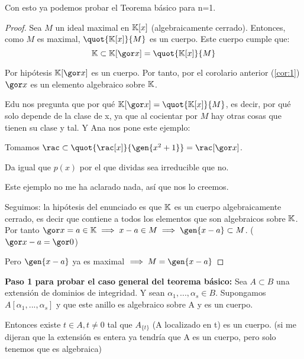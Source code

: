Con esto ya podemos probar el Teorema básico para n=1.
\begin{proof}
	Sea $M$ un ideal maximal en $\mathbb{K}[x]$ (algebraicamente cerrado). Entonces, como $M$ es maximal, $\quot{\K[x]}{M}$ es un cuerpo. Este cuerpo cumple que:
	$$ \K  \subset \K[\cls{x}] = \quot{\K[x]}{M}$$

	Por hipótesis $\K[\cls{x}]$ es un cuerpo. Por tanto, por el corolario anterior (\ref{cor:1}) $\cls{x}$ es un elemento algebraico sobre $\mathbb{K}$. 

	Edu nos pregunta que por qué $\K[\cls{x}] = \quot{\K[x]}{M}$, es decir, por qué solo depende de la clase de x, ya que al cocientar por $M$ hay otras cosas que tienen su clase y tal. Y Ana nos pone este ejemplo:

	\begin{example}
		Tomamos $\rac \subset \quot{\rac[x]}{\gen{x^2+1}} = \rac[\cls{x}]$.

		Da igual que $p(x)$ por el que dividas sea irreducible que no.
		
		Este ejemplo no me ha aclarado nada, así que nos lo creemos.
	\end{example}

	Seguimos: la hipótesis del enunciado es que $\mathbb{K}$ es un cuerpo algebraicamente cerrado, es decir que contiene a todos los elementos que son algebraicos sobre $\mathbb{K}$. Por tanto $\cls{x}=a \in \K \implies x-a \in M \implies \gen{x-a} \subset M$. ($\cls{x}-a = \cls{0}$)

	Pero $\gen{x-a}$ ya es maximal $\implies M = \gen{x-a}$
\end{proof}


\begin{prop}
	\textbf{Paso 1 para probar el caso general del teorema básico:}
	Sea $A \subset B$ una extensión de dominios de integridad. Y sean $\alpha_1,...,\alpha_s \in B$. Supongamos $A[\alpha_1,...,\alpha_s]$ y que este anillo es algebraico sobre A y es un cuerpo.

	Entonces existe $t \in A, t \neq 0$ tal que $A_{\{t\}}$ (A localizado en t) es un cuerpo. (si me dijeran que la extensión es entera ya tendría que A es un cuerpo, pero solo tenemos que es algebraica)
\end{prop}

